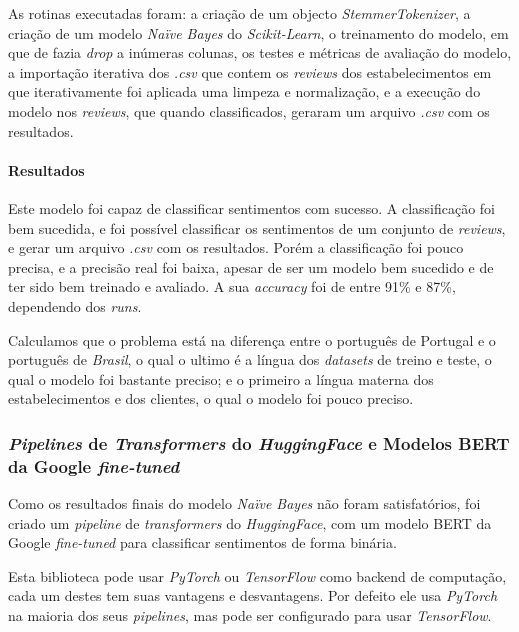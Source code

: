 As rotinas executadas foram: a criação de um objecto \textit{StemmerTokenizer}, a criação de um modelo \textit{Naïve Bayes} do \textit{Scikit-Learn}, o treinamento do modelo, em que de fazia \textit{drop} a inúmeras colunas, os testes e métricas de avaliação do modelo, a importação iterativa dos \textit{.csv} que contem os \textit{reviews} dos estabelecimentos em que iterativamente foi aplicada uma limpeza e normalização, e a execução do modelo nos \textit{reviews}, que quando classificados, geraram um arquivo \textit{.csv} com os resultados.

\paragraph{Resultados\\}

Este modelo foi capaz de classificar sentimentos com sucesso. A classificação foi bem sucedida, e foi possível classificar os sentimentos de um conjunto de \textit{reviews}, e gerar um arquivo \textit{.csv} com os resultados. Porém a classificação foi pouco precisa, e a precisão real foi baixa, apesar de ser um modelo bem sucedido e de ter sido bem treinado e avaliado. A sua \textit{accuracy} foi de entre 91\% e 87\%, dependendo dos \textit{runs}.

Calculamos que o problema está na diferença entre o português de Portugal e o português de \textit{Brasil}, o qual o ultimo é a língua dos \textit{datasets} de treino e teste, o qual o modelo foi bastante preciso; e o primeiro a língua materna dos estabelecimentos e dos clientes, o qual o modelo foi pouco preciso.

\subsubsection{\textit{Pipelines} de \textit{Transformers} do \textit{HuggingFace} e Modelos BERT da Google \textit{fine-tuned}}

Como os resultados finais do modelo \textit{Naïve Bayes} não foram satisfatórios, foi criado um \textit{pipeline} de \textit{transformers} do \textit{HuggingFace}, com um modelo BERT da Google \textit{fine-tuned} para classificar sentimentos de forma binária.

Esta biblioteca pode usar \textit{PyTorch} ou \textit{TensorFlow} como backend de computação, cada um destes tem suas vantagens e desvantagens. Por defeito ele usa \textit{PyTorch} na maioria dos seus \textit{pipelines}, mas pode ser configurado para usar \textit{TensorFlow}.

